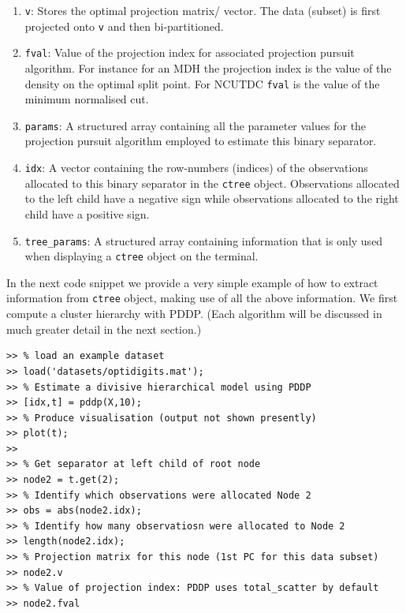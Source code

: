 \documentclass{book}
\begin{document}
\begin{enumerate}

\item {\tt v}: Stores the optimal projection matrix/ vector. The data (subset)
is first projected onto {\tt v} and then bi-partitioned.

\item {\tt fval}: Value of the projection index for associated projection pursuit
algorithm. For instance for an MDH the projection index is the value of the
density on the optimal split point. For NCUTDC {\tt fval} is the value of the minimum
normalised cut.

\item {\tt params}: A structured array containing all the parameter values for
the projection pursuit algorithm employed to estimate this binary separator.

\item {\tt idx}: A vector containing the row-numbers (indices) of the observations
allocated to this binary separator in the {\tt ctree} object. Observations
allocated to the left child have a negative sign while observations allocated
to the right child have a positive sign.

\item {\tt tree\_params}: A structured array containing information that is
only used when displaying a {\tt ctree} object on the terminal.

\end{enumerate}


\noindent
%
In the next code snippet we provide a very simple example of how to extract information from
{\tt ctree} object, making use of all the above information. We first compute a
cluster hierarchy with PDDP. (Each algorithm will be discussed in much greater detail in the 
next section.) 

\begin{verbatim}
>> % load an example dataset
>> load('datasets/optidigits.mat');
>> % Estimate a divisive hierarchical model using PDDP
>> [idx,t] = pddp(X,10);
>> % Produce visualisation (output not shown presently)
>> plot(t);
>>
>> % Get separator at left child of root node
>> node2 = t.get(2);
>> % Identify which observations were allocated Node 2
>> obs = abs(node2.idx);
>> % Identify how many observatiosn were allocated to Node 2
>> length(node2.idx);
>> % Projection matrix for this node (1st PC for this data subset)
>> node2.v
>> % Value of projection index: PDDP uses total_scatter by default
>> node2.fval 
\end{verbatim}
\end{document}
